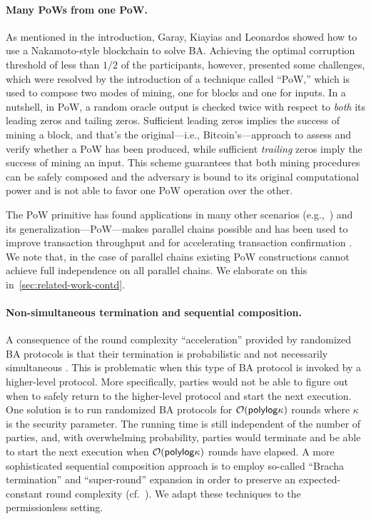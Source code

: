 \paragraph{Many PoWs from one PoW.}
%
As mentioned in the introduction, Garay, Kiayias and Leonardos \cite{EC:GarKiaLeo15} showed how to use a Nakamoto-style blockchain to solve BA.
%
Achieving the optimal corruption threshold of less than $1/2$ of the participants, however, presented some challenges, which were resolved by the introduction of a technique called ``\twoforone PoW,'' which is used to compose two modes of mining, one for blocks and one for inputs.
%
In a nutshell, in \twoforone PoW, a random oracle output is checked twice with respect to \emph{both} its leading zeros and tailing zeros.
%
Sufficient leading zeros implies the success of mining a block, and that's the original---i.e., Bitcoin's---approach to assess and verify whether a PoW has been produced, while sufficient \emph{trailing} zeros imply the success of mining an input.
%
This scheme guarantees that both mining procedures can be safely composed and the adversary is bound to its original computational power and is not able to favor one PoW operation over the other.

The \twoforone PoW primitive has found applications in many other scenarios (e.g.,~\cite{PODC:PasShi17}) and its generalization---\mforone PoW---makes parallel chains possible and has been used to improve transaction throughput \cite{CCS:BKTFV19} and for accelerating transaction confirmation \cite{TCC:FGKR20}.
%
We note that, in the case of parallel chains existing \mforone PoW constructions cannot achieve full independence on all parallel chains.
%
We elaborate on this in~\cref{sec:related-work-contd}.

\paragraph{Non-simultaneous termination and sequential composition.}
%
A consequence of the round complexity ``acceleration'' provided by randomized BA protocols is that their termination is probabilistic and not necessarily simultaneous \cite{JACM:DolReiStr90}.
%
This is problematic when this type of BA protocol is invoked by a higher-level protocol.
%
More specifically, parties would not be able to figure out when to safely return to the higher-level protocol and start the next execution.
%
One solution is to run randomized BA protocols for $\mathcal{O}(\mathsf{polylog} \kappa)$ rounds where $\kappa$ is the security parameter.
%
The running time is still independent of the number of parties, and, with overwhelming probability, parties would terminate and be able to start the next execution when $\mathcal{O}(\mathsf{polylog} \kappa)$ rounds have elapsed.
%
A more sophisticated sequential composition approach is to employ so-called ``Bracha termination'' and ``super-round'' expansion in order to preserve an expected-constant round complexity (cf.~\cite{C:CCGZ16}).
%
We adapt these techniques to the permissionless setting.

